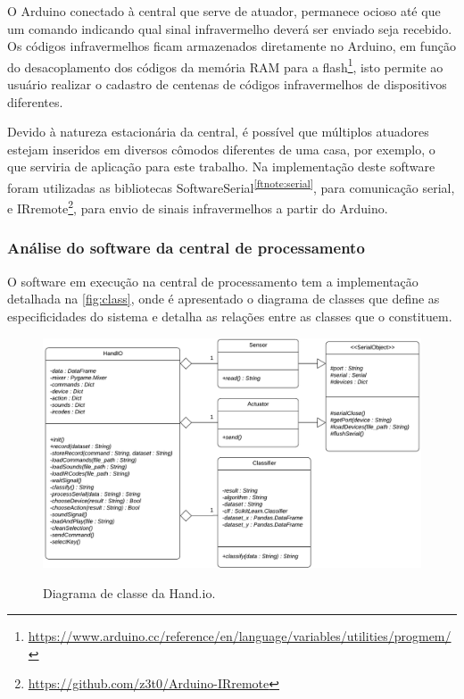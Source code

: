 
O Arduino conectado à central que serve de atuador, permanece ocioso até que um comando indicando qual sinal infravermelho deverá ser enviado seja recebido. Os códigos infravermelhos ficam armazenados diretamente no Arduino, em função do desacoplamento dos códigos da memória RAM para a flash\footnote{\url{https://www.arduino.cc/reference/en/language/variables/utilities/progmem/}}, isto permite ao usuário realizar o cadastro de centenas de códigos infravermelhos de dispositivos diferentes. 

Devido à natureza estacionária da central, é possível que múltiplos atuadores estejam inseridos em diversos cômodos diferentes de uma casa, por exemplo, o que serviria de aplicação para este trabalho. Na implementação deste software foram utilizadas as bibliotecas SoftwareSerial\textsuperscript{\ref{ftnote:serial}}, para comunicação serial, e IRremote\footnote{\url{https://github.com/z3t0/Arduino-IRremote}}, para envio de sinais infravermelhos a partir do Arduino.


\subsubsection{Análise do software da central de processamento}


O software em execução na central de processamento tem a implementação detalhada na \autoref{fig:class}, onde é apresentado o diagrama de classes que define as especificidades do sistema e detalha as relações entre as classes que o constituem.

\begin{figure}[ht]
    \centering
    \caption{Diagrama de classe da Hand.io.}
    \includegraphics[width=\textwidth, keepaspectratio]{resources/diagrama_classe.pdf}
    \label{fig:class}
\end{figure}


